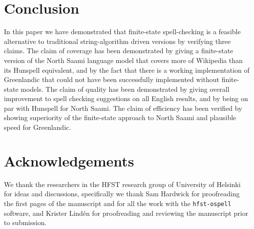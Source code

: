 \documentclass[a4paper,12pt]{article}
\begin{document}
\section{Conclusion}
\label{sec:conclusion}

In this paper we have demonstrated that finite-state spell-checking is a
feasible alternative to traditional string-algorithm driven versions by
verifying three claims. The claim of coverage has been demonstrated by giving a
finite-state version of the North Saami language model that covers more of
Wikipedia than its Hunspell equivalent, and by the fact that there is a working
implementation of Greenlandic that could not have been successfully implemented
without finite-state models. The claim of quality has been demonstrated by
giving overall improvement to spell checking suggestions on all English
results, and by being on par with Hunspell for North Saami. The claim of
efficiency has been verified by showing superiority of the finite-state
approach to North Saami and plausible speed for Greenlandic.

\section*{Acknowledgements}

We thank the researchers in the HFST research group of University of Helsinki
for ideas and discussions, specifically we thank Sam Hardwick for proofreading
the first pages of the manuscript and for all the work with the 
\texttt{hfst-ospell} software, and Krister Lindén for proofreading and 
reviewing the manuscript prior to submission.


\end{document}
